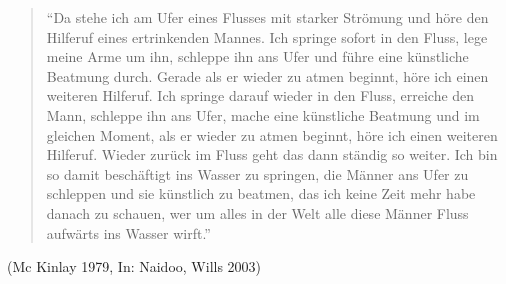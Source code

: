 \begin{quotation}
"`Da stehe ich am Ufer eines Flusses mit starker Strömung und höre den Hilferuf eines ertrinkenden Mannes. Ich springe sofort in den Fluss, lege meine Arme um ihn, schleppe ihn ans Ufer und führe eine künstliche Beatmung durch. Gerade als er wieder zu atmen beginnt, höre ich einen weiteren Hilferuf. Ich springe darauf wieder in den Fluss, erreiche den Mann, schleppe ihn ans Ufer, mache eine künstliche Beatmung und im gleichen Moment, als er wieder zu atmen beginnt, höre ich einen weiteren Hilferuf. Wieder zurück im Fluss geht das dann ständig so weiter. Ich bin so damit beschäftigt ins Wasser zu springen, die Männer ans Ufer zu schleppen und sie künstlich zu beatmen, das ich keine Zeit mehr habe danach zu schauen, wer um alles in der Welt alle diese Männer Fluss aufwärts ins Wasser wirft."'
\end{quotation}

\begin{flushright}
(Mc Kinlay 1979, In: Naidoo, Wills 2003)
\end{flushright}